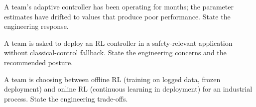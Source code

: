 \begin{exercise}
A team's adaptive controller has been operating for months; the parameter estimates have drifted to values that produce poor performance. State the engineering response.
\end{exercise}

\begin{exercise}
A team is asked to deploy an RL controller in a safety-relevant application without classical-control fallback. State the engineering concerns and the recommended posture.
\end{exercise}

\begin{exercise}
A team is choosing between offline RL (training on logged data, frozen deployment) and online RL (continuous learning in deployment) for an industrial process. State the engineering trade-offs.
\end{exercise}
